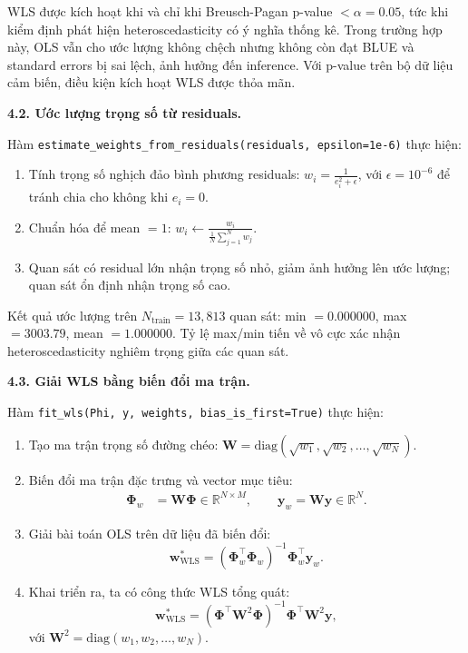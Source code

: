 WLS được kích hoạt khi và chỉ khi Breusch-Pagan p-value $< \alpha = 0.05$, tức khi kiểm định phát hiện heteroscedasticity có ý nghĩa thống kê. Trong trường hợp này, OLS vẫn cho ước lượng không chệch nhưng không còn đạt BLUE và standard errors bị sai lệch, ảnh hưởng đến inference. Với p-value trên bộ dữ liệu cảm biến, điều kiện kích hoạt WLS được thỏa mãn.

\textbf{4.2. Ước lượng trọng số từ residuals.}

Hàm \texttt{estimate\_weights\_from\_residuals(residuals, epsilon=1e-6)} thực hiện:
\begin{enumerate}
    \item Tính trọng số nghịch đảo bình phương residuals:
          $w_i = \frac{1}{e_i^2 + \epsilon}$, với $\epsilon = 10^{-6}$ để tránh chia cho không khi $e_i = 0$.

    \item Chuẩn hóa để mean $= 1$:
          $w_i \leftarrow \frac{w_i}{\frac{1}{N}\sum_{j=1}^{N} w_j}$.

    \item Quan sát có residual lớn nhận trọng số nhỏ, giảm ảnh hưởng lên ước lượng; quan sát ổn định nhận trọng số cao.
\end{enumerate}

Kết quả ước lượng trên $N_{\text{train}} = 13{,}813$ quan sát: min $= 0.000000$, max $= 3003.79$, mean $= 1.000000$. Tỷ lệ max/min tiến về vô cực xác nhận heteroscedasticity nghiêm trọng giữa các quan sát.

\textbf{4.3. Giải WLS bằng biến đổi ma trận.}

Hàm \texttt{fit\_wls(Phi, y, weights, bias\_is\_first=True)} thực hiện:
\begin{enumerate}
    \item Tạo ma trận trọng số đường chéo: $\mathbf{W} = \mathrm{diag}(\sqrt{w_1}, \sqrt{w_2}, \ldots, \sqrt{w_N})$.

    \item Biến đổi ma trận đặc trưng và vector mục tiêu:
    \begin{align*}
        \boldsymbol{\Phi}_w &= \mathbf{W} \boldsymbol{\Phi} \in \mathbb{R}^{N \times M}, \qquad
        \mathbf{y}_w = \mathbf{W} \mathbf{y} \in \mathbb{R}^{N}.
    \end{align*}

    \item Giải bài toán OLS trên dữ liệu đã biến đổi:
    \begin{equation}
        \mathbf{w}^*_{\text{WLS}} = (\boldsymbol{\Phi}_w^{\top} \boldsymbol{\Phi}_w)^{-1} \boldsymbol{\Phi}_w^{\top} \mathbf{y}_w.
    \end{equation}

    \item Khai triển ra, ta có công thức WLS tổng quát:
    \begin{equation}
        \mathbf{w}^*_{\text{WLS}} = (\boldsymbol{\Phi}^{\top} \mathbf{W}^2 \boldsymbol{\Phi})^{-1} \boldsymbol{\Phi}^{\top} \mathbf{W}^2 \mathbf{y},
    \end{equation}
    với $\mathbf{W}^2 = \mathrm{diag}(w_1, w_2, \ldots, w_N)$.
\end{enumerate}

